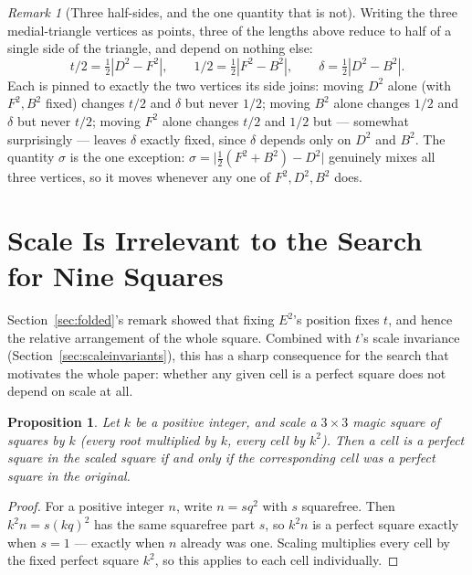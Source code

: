 \documentclass[12pt]{article}
\newtheorem{proposition}[theorem]{Proposition}
\theoremstyle{remark}
\newtheorem{remark}[theorem]{Remark}
\begin{document}
\begin{remark}[Three half-sides, and the one quantity that is not]
Writing the three medial-triangle vertices as points, three of the
lengths above reduce to half of a single side of the triangle, and
depend on nothing else:
\[
t/2 = \tfrac12 |D^2 - F^2|, \qquad
1/2 = \tfrac12 |F^2 - B^2|, \qquad
\delta = \tfrac12 |D^2 - B^2| .
\]
Each is pinned to exactly the two vertices its side joins: moving
$D^2$ alone (with $F^2, B^2$ fixed) changes $t/2$ and $\delta$ but
never $1/2$; moving $B^2$ alone changes $1/2$ and $\delta$ but never
$t/2$; moving $F^2$ alone changes $t/2$ and $1/2$ but --- somewhat
surprisingly --- leaves $\delta$ exactly fixed, since $\delta$ depends
only on $D^2$ and $B^2$. The quantity $\sigma$ is the one exception:
$\sigma = \bigl|\tfrac12(F^2+B^2) - D^2\bigr|$ genuinely mixes all
three vertices, so it moves whenever any one of $F^2, D^2, B^2$ does.
\end{remark}

\section{Scale Is Irrelevant to the Search for Nine Squares}\label{sec:scaleirrelevant}

Section~\ref{sec:folded}'s remark showed that fixing $E^2$'s position
fixes $t$, and hence the relative arrangement of the whole square.
Combined with $t$'s scale invariance (Section~\ref{sec:scaleinvariants}),
this has a sharp consequence for the search that motivates the whole
paper: whether any given cell is a perfect square does not depend on
scale at all.

\begin{proposition}\label{prop:scaleirrelevant}
Let $k$ be a positive integer, and scale a $3\times3$ magic square of
squares by $k$ (every root multiplied by $k$, every cell by $k^2$).
Then a cell is a perfect square in the scaled square if and only if
the corresponding cell was a perfect square in the original.
\end{proposition}

\begin{proof}
For a positive integer $n$, write $n = s q^2$ with $s$ squarefree.
Then $k^2 n = s (kq)^2$ has the same squarefree part $s$, so $k^2n$ is
a perfect square exactly when $s = 1$ --- exactly when $n$ already
was one. Scaling multiplies every cell by the fixed perfect square
$k^2$, so this applies to each cell individually.
\end{proof}
\end{document}
